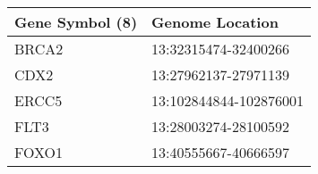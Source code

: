 \begin{tabular}{ll}
\toprule
Gene Symbol (8) &        Genome Location \\
\midrule
          BRCA2 &   13:32315474-32400266 \\
           CDX2 &   13:27962137-27971139 \\
          ERCC5 & 13:102844844-102876001 \\
           FLT3 &   13:28003274-28100592 \\
          FOXO1 &   13:40555667-40666597 \\
\bottomrule
\end{tabular}

